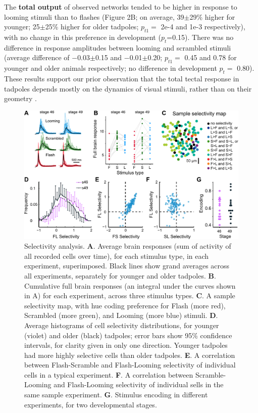 \documentclass{article}
\begin{document}
The \textbf{total output} of observed networks tended to be higher in response to looming stimuli than to flashes (Figure 2B; on average, 39$\pm$29\% higher for younger; 25$\pm$25\% higher for older tadpoles; $p_{t1}=$ 2e-4 and 1e-3 respectively), with no change in this preference in development ($p_t$=0.15). There was no difference in response amplitudes between looming and scrambled stimuli (average difference of $-$0.03$\pm$0.15 and $-$0.01$\pm$0.20; $p_{t1}=$ 0.45 and 0.78 for younger and older animals respectively; no difference in development $p_t=$ 0.80). These results support our prior observation that the total tectal response in tadpoles depends mostly on the dynamics of visual stimuli, rather than on their geometry \citep{khakhalin2014, jang2016}.

\begin{figure}[t!]
\includegraphics[width=\linewidth]{fig2.pdf}
\caption{
Selectivity analysis. \textbf{A}. Average brain responses (sum of activity of all recorded cells over time), for each stimulus type, in each experiment, superimposed. Black lines show grand averages across all experiments, separately for younger and older tadpoles. \textbf{B}. Cumulative full brain responses (an integral under the curves shown in A) for each experiment, across three stimulus types. \textbf{C}. A sample selectivity map, with hue coding preference for Flash (more red), Scrambled (more green), and Looming (more blue) stimuli. \textbf{D}. Average histograms of cell selectivity distributions, for younger (violet) and older (black) tadpoles; error bars show 95\% confidence intervals, for clarity given in only one direction. Younger tadpoles had more highly selective cells than older tadpoles. \textbf{E}. A correlation between Flash-Scramble and Flash-Looming selectivity of individual cells in a typical experiment. \textbf{F}. A correlation between Scramble-Looming and Flash-Looming selectivity of individual sells in the same sample experiment. \textbf{G}. Stimulus encoding in different experiments, for two developmental stages.}
\end{figure}
\end{document}

